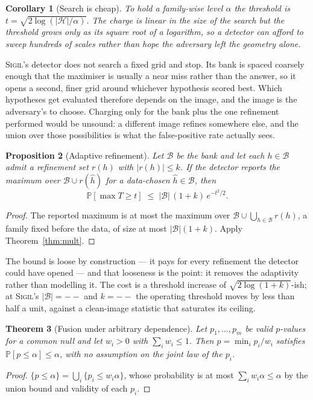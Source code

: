 \documentclass[10pt,twocolumn]{article}
\newtheorem{theorem}{Theorem}
\newtheorem{proposition}[theorem]{Proposition}
\newtheorem{corollary}[theorem]{Corollary}
\theoremstyle{definition}
\theoremstyle{remark}
\renewcommand{\Pr}{\mathbb{P}}
\newcommand{\sigil}{\textsc{Sigil}}
\providecommand{\nhypotheses}{--}
\providecommand{\nrefine}{--}
\begin{document}
\begin{corollary}[Search is cheap]
To hold a family-wise level $\alpha$ the threshold is
$t=\sqrt{2\log(|\mathcal{H}|/\alpha)}$. The charge is linear in the size of the
search but the threshold grows only as its square root of a logarithm, so a
detector can afford to sweep hundreds of scales rather than hope the adversary
left the geometry alone.
\end{corollary}

\sigil{}'s detector does not search a fixed grid and stop. Its bank is spaced
coarsely enough that the maximiser is usually a near miss rather than the answer,
so it opens a second, finer grid around whichever hypothesis scored best. Which
hypotheses get evaluated therefore depends on the image, and the image is the
adversary's to choose. Charging only for the bank plus the one refinement
performed would be unsound: a different image refines somewhere else, and the
union over those possibilities is what the false-positive rate actually sees.

\begin{proposition}[Adaptive refinement]
\label{prop:refine}
Let $\mathcal{B}$ be the bank and let each $h\in\mathcal{B}$ admit a refinement
set $r(h)$ with $|r(h)|\leq k$. If the detector reports the maximum over
$\mathcal{B}\cup r(\hat h)$ for a data-chosen $\hat h\in\mathcal{B}$, then
\[
  \Pr\!\left[\max T \geq t\right] \;\leq\; |\mathcal{B}|\,(1+k)\,e^{-t^{2}/2}.
\]
\end{proposition}
\begin{proof}
The reported maximum is at most the maximum over
$\mathcal{B}\cup\bigcup_{h\in\mathcal{B}}r(h)$, a family fixed before the data,
of size at most $|\mathcal{B}|(1+k)$. Apply Theorem~\ref{thm:mult}.
\end{proof}

The bound is loose by construction --- it pays for every refinement the detector
could have opened --- and that looseness is the point: it removes the adaptivity
rather than modelling it. The cost is a threshold increase of
$\sqrt{2\log(1+k)}$-ish; at \sigil{}'s $|\mathcal{B}|=\nhypotheses$ and $k=\nrefine$
the operating threshold moves by less than half a unit, against a clean-image
statistic that saturates its ceiling.

\begin{theorem}[Fusion under arbitrary dependence]
\label{thm:fusion}
Let $p_1,\dots,p_m$ be valid $p$-values for a common null and let $w_i>0$ with
$\sum_i w_i\leq1$. Then $p=\min_i p_i/w_i$ satisfies $\Pr[p\leq\alpha]\leq\alpha$,
with no assumption on the joint law of the $p_i$.
\end{theorem}
\begin{proof}
$\{p\leq\alpha\}=\bigcup_i\{p_i\leq w_i\alpha\}$, whose probability is at most
$\sum_i w_i\alpha\leq\alpha$ by the union bound and validity of each $p_i$.
\end{proof}
\end{document}
